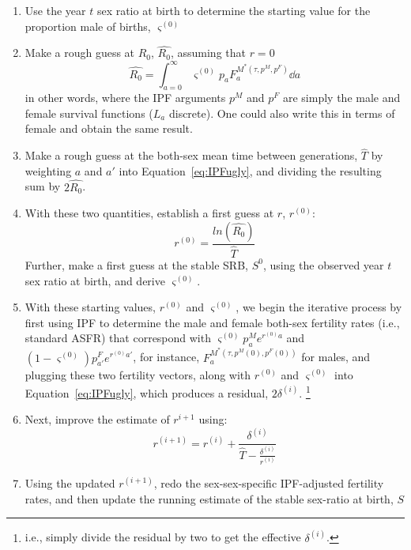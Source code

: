 \begin{enumerate}
  \item Use the year $t$ sex ratio at birth to determine the starting value for
  the proportion male of births, $\varsigma^{(0)}$
  \item Make a rough guess at $R_0$, $\widehat{R_0}$, assuming that $r = 0$
  \begin{equation}
  \widehat{R_0} = \int_{a=0}^\infty \varsigma^{(0)} p_aF_a^{M^\ast(\tau,p^{M},
  p^{F})} \dd a
  \end{equation}
  in other words, where the IPF arguments $p^{M}$ and $p^{F}$ are simply the
  male and female survival functions ($L_a$ discrete). One could also write this
  in terms of female and obtain the same result.
  \item Make a rough guess at the both-sex mean time between generations,
  $\widehat{T}$ by weighting $a$ and $a'$ into Equation~\eqref{eq:IPFugly},
  and dividing the resulting sum by $2\widehat{R_0}$.
  \item With these two quantities, establish a first guess at $r$,
  $r^{(0)}$:
  \begin{equation}
  r^{(0)} = \frac{ln(\widehat{R_0})}{\widehat{T}}
  \end{equation}
  Further, make a first guess at the stable SRB, $S^0$, using
  the observed year $t$ sex ratio at birth, and derive $\varsigma^{(0)}$.
  \item With these starting values, $r^{(0)}$ and $\varsigma^{(0)}$, we begin
  the iterative process by first using IPF to determine the male and female
  both-sex fertility rates (i.e., standard ASFR) that correspond with
  $\varsigma^{(0)} p_a^Me^{r^{(0)}a}$ and $(1-\varsigma^{(0)})p_{a'}^Fe^{r^{(0)}a'}$, for
  instance, $F_a^{M^\ast(\tau,p^{M}(0), p^{F}(0))}$ for males, and plugging
  these two fertility vectors, along with $r^{(0)}$ and $\varsigma^{(0)}$ into
  Equation~\eqref{eq:IPFugly}, which produces a residual, $2\delta^{(i)}$.
  \footnote{i.e., simply divide the residual by two to get the effective
  $\delta^{(i)}$.}
  \item Next, improve the estimate of $r^{i+1}$ using: 
  \begin{equation}
  r^{(i+1)} = r^{(i)} + \frac{\delta^{(i)}}{\widehat{T} -
\frac{\delta ^{(i)}}{r^{(i)} }}
  \end{equation}
  \item Using the updated $r^{(i+1)}$, redo the sex-sex-specific IPF-adjusted
  fertility rates, and then update the running estimate of the stable
  sex-ratio at birth, $S$

\end{enumerate}
